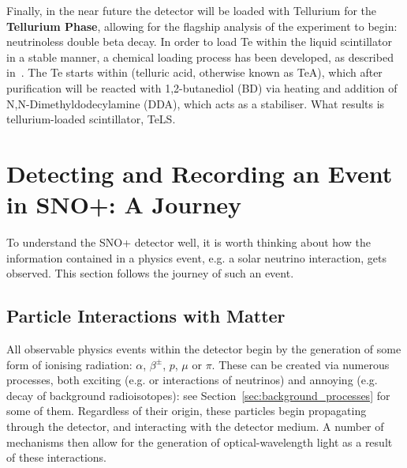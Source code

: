 Finally, in the near future the detector will be loaded with Tellurium for the \textbf{Tellurium Phase}, allowing for the flagship analysis of the experiment to begin: neutrinoless double beta decay. In order to load Te within the liquid scintillator in a stable manner, a chemical loading process has been developed, as described in~\cite{autyMethodLoadTellurium2023}. %
The Te starts within  (telluric acid, otherwise known as TeA), which after purification will be reacted with 1,2-butanediol (BD) via heating and addition of N,N-Dimethyldodecylamine (DDA), which acts as a stabiliser. What results is tellurium-loaded scintillator, TeLS.


\section{Detecting and Recording an Event in SNO+: A Journey}\label{sec:event_journey}
To understand the SNO+ detector well, it is worth thinking about how the information contained in a physics event, e.g. a solar neutrino interaction, gets observed. This section follows the journey of such an event.
\subsection{Particle Interactions with Matter}\label{sec:interactions_w_matter}
All observable physics events within the detector begin by the generation of some form of ionising radiation: $\alpha$, $\beta^{\pm}$, $p$, $\mu$ or $\pi$. These can be created via numerous processes, both exciting (e.g. \onbb{} or interactions of neutrinos) and annoying (e.g. decay of background radioisotopes): see Section~\ref{sec:background_processes} for some of them. Regardless of their origin, these particles begin propagating through the detector, and interacting with the detector medium. A number of mechanisms then allow for the generation of optical-wavelength light as a result of these interactions.
